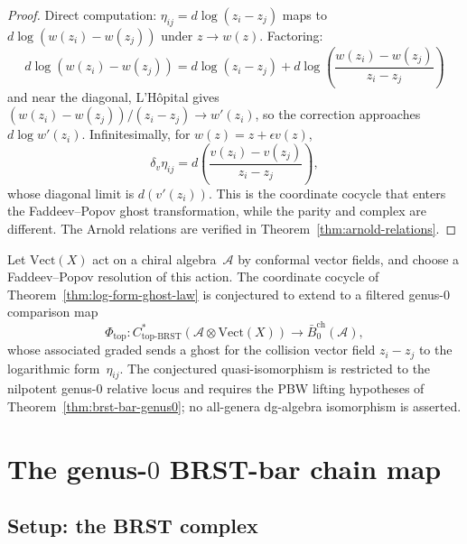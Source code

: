 \begin{proof}
Direct computation: $\eta_{ij} = d\log(z_i - z_j)$
maps to $d\log(w(z_i) - w(z_j))$ under $z \to w(z)$.
Factoring:
\[
d\log(w(z_i) - w(z_j)) = d\log(z_i - z_j)
+ d\log\!\left(\frac{w(z_i) - w(z_j)}{z_i - z_j}\right)
\]
and near the diagonal, L'H\^opital gives
$(w(z_i) - w(z_j))/(z_i - z_j) \to w'(z_i)$, so
the correction approaches $d\log w'(z_i)$. Infinitesimally, for
$w(z)=z+\epsilon v(z)$,
\[
\delta_v\eta_{ij}
=d\!\left(\frac{v(z_i)-v(z_j)}{z_i-z_j}\right),
\]
whose diagonal limit is $d(v'(z_i))$. This is the coordinate
cocycle that enters the Faddeev--Popov ghost transformation, while
the parity and complex are different. The Arnold relations are
verified in Theorem~\ref{thm:arnold-relations}.
\end{proof}

\begin{conjecture}
\label{conj:v1-bar-topological-brst}
Let $\mathrm{Vect}(X)$ act on a chiral algebra~$\mathcal A$ by
conformal vector fields, and choose a Faddeev--Popov resolution of
this action. The coordinate cocycle of
Theorem~\ref{thm:log-form-ghost-law} is conjectured to extend to a filtered
genus-$0$ comparison map
\[
\Phi_{\mathrm{top}}\colon
C^*_{\mathrm{top}\text{-}\mathrm{BRST}}
(\mathcal A\otimes \mathrm{Vect}(X))
\longrightarrow
\bar{B}^{\mathrm{ch}}_0(\mathcal A),
\]
whose associated graded sends a ghost for the collision vector field
$z_i-z_j$ to the logarithmic form~$\eta_{ij}$. The conjectured
quasi-isomorphism is restricted to the nilpotent genus-$0$ relative
locus and requires the PBW lifting hypotheses of
Theorem~\ref{thm:brst-bar-genus0}; no all-genera dg-algebra
isomorphism is asserted.
\end{conjecture}

\section{The genus-\texorpdfstring{$0$}{0} BRST-bar chain map}
\label{sec:brst-bar-chain-map}

\subsection{Setup: the BRST complex}

